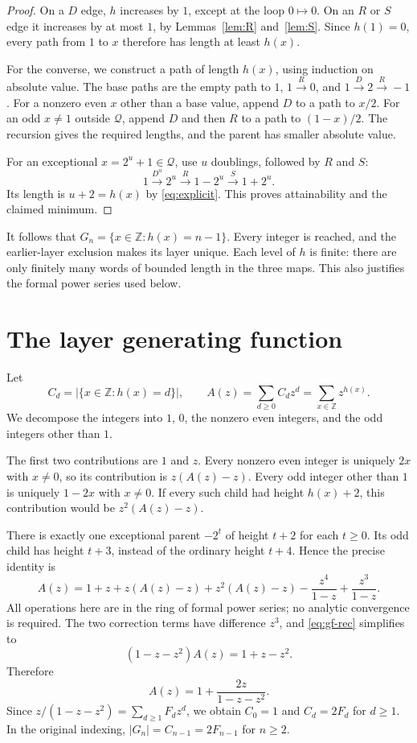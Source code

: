 \documentclass[11pt]{article}
\theoremstyle{remark}
\newcommand{\Z}{\mathbb Z}
\begin{document}
\begin{proof}
On a $D$ edge, $h$ increases by $1$, except at the loop $0\mapsto0$.
On an $R$ or $S$ edge it increases by at most $1$, by
Lemmas~\ref{lem:R} and~\ref{lem:S}. Since $h(1)=0$, every path from
$1$ to $x$ therefore has length at least $h(x)$.

For the converse, we construct a path of length $h(x)$, using induction
on absolute value. The base paths are the empty path to $1$,
$1\xrightarrow{R}0$, and
$1\xrightarrow{D}2\xrightarrow{R}-1$.
For a nonzero even $x$ other than a base value, append $D$ to a path
to $x/2$. For an odd $x\ne1$ outside $\mathcal Q$, append $D$ and
then $R$ to a path to $(1-x)/2$. The recursion gives the required
lengths, and the parent has smaller absolute value.

For an exceptional $x=2^u+1\in\mathcal Q$, use $u$ doublings,
followed by $R$ and $S$:
\[
1\xrightarrow{D^u}2^u\xrightarrow{R}1-2^u
  \xrightarrow{S}1+2^u.
\]
Its length is $u+2=h(x)$ by \eqref{eq:explicit}. This proves
attainability and the claimed minimum.
\end{proof}

It follows that $G_n=\{x\in\Z:h(x)=n-1\}$. Every integer is reached,
and the earlier-layer exclusion makes its layer unique. Each level of
$h$ is finite: there are only finitely many words of bounded length in
the three maps. This also justifies the formal power series used below.

\section{The layer generating function}

Let
\[
C_d=|\{x\in\Z:h(x)=d\}|,\qquad
A(z)=\sum_{d\ge0}C_dz^d=\sum_{x\in\Z}z^{h(x)}.
\]
We decompose the integers into $1$, $0$, the nonzero even integers,
and the odd integers other than $1$.

The first two contributions are $1$ and $z$. Every nonzero even
integer is uniquely $2x$ with $x\ne0$, so its contribution is
$z(A(z)-z)$. Every odd integer other than $1$ is uniquely $1-2x$
with $x\ne0$. If every such child had height $h(x)+2$, this contribution
would be $z^2(A(z)-z)$.

There is exactly one exceptional parent $-2^t$ of height $t+2$ for
each $t\ge0$. Its odd child has height $t+3$, instead of the ordinary
height $t+4$. Hence the precise identity is
\begin{equation}\label{eq:gf-rec}
A(z)=1+z+z(A(z)-z)+z^2(A(z)-z)
            -\frac{z^4}{1-z}+\frac{z^3}{1-z}.
\end{equation}
All operations here are in the ring of formal power series; no analytic
convergence is required. The two correction terms have difference $z^3$,
and \eqref{eq:gf-rec} simplifies to
\[
(1-z-z^2)A(z)=1+z-z^2.
\]
Therefore
\begin{equation}\label{eq:gf}
\boxed{A(z)=1+\frac{2z}{1-z-z^2}.}
\end{equation}
Since $z/(1-z-z^2)=\sum_{d\ge1}F_dz^d$, we obtain
$C_0=1$ and $C_d=2F_d$ for $d\ge1$. In the original indexing,
$|G_n|=C_{n-1}=2F_{n-1}$ for $n\ge2$.
\end{document}
